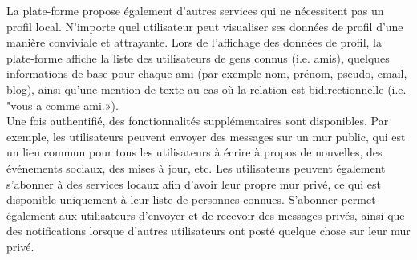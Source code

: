 La plate-forme propose également d'autres services qui ne nécessitent pas un profil local. N'importe quel utilisateur peut visualiser ses données de profil d'une manière conviviale et attrayante. Lors de l'affichage des données de profil, la plate-forme affiche la liste des utilisateurs de gens connus (i.e. amis), quelques informations de base pour chaque ami (par exemple nom, prénom, pseudo, email, blog), ainsi qu'une mention de texte au cas où la relation est bidirectionnelle (i.e. "vous a comme ami.»).\\


Une fois authentifié, des fonctionnalités supplémentaires sont disponibles. Par exemple, les utilisateurs peuvent envoyer des messages sur un mur public, qui est un lieu commun pour tous les utilisateurs à écrire à propos de nouvelles, des événements sociaux, des mises à jour, etc. Les utilisateurs peuvent également s'abonner à des services locaux afin d'avoir leur propre mur privé, ce qui est disponible uniquement à leur liste de personnes connues. S'abonner permet également aux utilisateurs d'envoyer et de recevoir des messages privés, ainsi que des notifications lorsque d'autres utilisateurs ont posté quelque chose sur leur mur privé.\\

